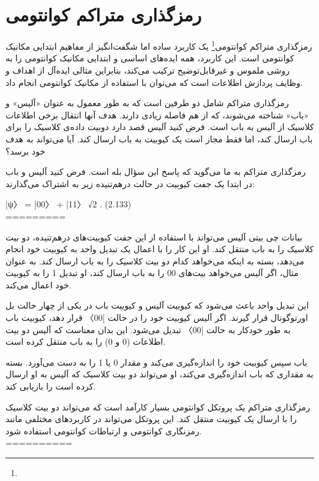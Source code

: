 \documentclass{book}
\begin{document}
\section{رمزگذاری متراکم کوانتومی}

رمزگذاری متراکم کوانتومی\footnote{} یک کاربرد ساده اما شگفت‌انگیز از مفاهیم ابتدایی مکانیک کوانتومی است. این کاربرد، همه ایده‌های اساسی و ابتدایی مکانیک کوانتومی را به روشی ملموس و غیرقابل‌توضیح ترکیب می‌کند، بنابراین مثالی ایده‌آل از اهداف و وظایف پردازش اطلاعات است که می‌توان با استفاده از مکانیک کوانتومی انجام داد.

رمزگذاری متراکم شامل دو طرفین است که به طور معمول به عنوان «آلیس» و «باب» شناخته می‌شوند، که از هم فاصله زیادی دارند. هدف آنها انتقال برخی اطلاعات کلاسیک از آلیس به باب است. فرض کنید آلیس قصد دارد دوبیت داده‌ی کلاسیک را برای باب ارسال کند، اما فقط مجاز است یک کیوبیت به باب ارسال کند. آیا می‌تواند به هدف خود برسد؟

رمزگذاری متراکم به ما می‌گوید که پاسخ این سؤال بله است. فرض کنید آلیس و باب در ابتدا یک جفت کیوبیت در حالت درهم‌تنیده زیر به اشتراک می‌گذارند:

|ψ〉 = |00〉 + |11〉
√2 . (2.133)\\
=========

بیانات چی بیتی
آلیس می‌تواند با استفاده از این جفت کیوبیت‌های درهم‌تنیده، دو بیت کلاسیک را به باب منتقل کند. او این کار را با اعمال یک تبدیل واحد به کیوبیت خود انجام می‌دهد، بسته به اینکه می‌خواهد کدام دو بیت کلاسیک را به باب ارسال کند. به عنوان مثال، اگر آلیس می‌خواهد بیت‌های 00 را به باب ارسال کند، او تبدیل 1 را به کیوبیت خود اعمال می‌کند.

این تبدیل واحد باعث می‌شود که کیوبیت آلیس و کیوبیت باب در یکی از چهار حالت بل اورتوگونال قرار گیرند. اگر آلیس کیوبیت خود را در حالت |00〉 قرار دهد، کیوبیت باب به طور خودکار به حالت |00〉 تبدیل می‌شود. این بدان معناست که آلیس دو بیت اطلاعات (0 و 0) را به باب منتقل کرده است.

باب سپس کیوبیت خود را اندازه‌گیری می‌کند و مقدار 0 یا 1 را به دست می‌آورد. بسته به مقداری که باب اندازه‌گیری می‌کند، او می‌تواند دو بیت کلاسیک که آلیس به او ارسال کرده است را بازیابی کند.

رمزگذاری متراکم یک پروتکل کوانتومی بسیار کارآمد است که می‌تواند دو بیت کلاسیک را با ارسال یک کیوبیت منتقل کند. این پروتکل می‌تواند در کاربردهای مختلفی مانند رمزنگاری کوانتومی و ارتباطات کوانتومی استفاده شود.\\
==========\\
\end{document}
